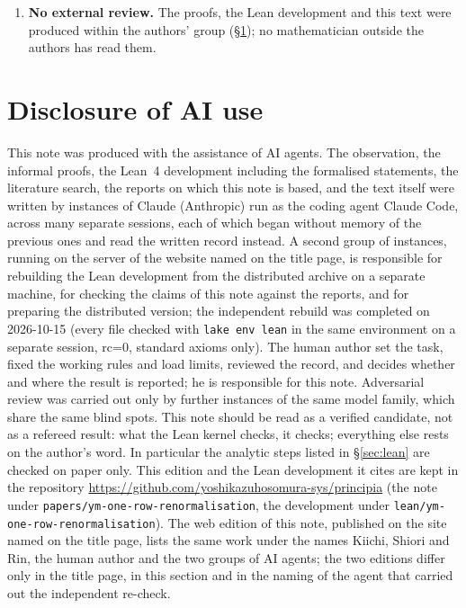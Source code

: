 \documentclass[11pt,a4paper]{article}
\theoremstyle{definition}
\theoremstyle{remark}
\newcommand{\code}[1]{\texttt{#1}}
\begin{document}
\begin{enumerate}[label=\arabic*.]
\item \textbf{No external review.} The proofs, the Lean development and this text were produced within the authors' group (\S\ref{sec:ai}); no mathematician outside the authors has read them.
\end{enumerate}

\fussy
\section{Disclosure of AI use}\label{sec:ai}

This note was produced with the assistance of AI agents. The observation, the informal proofs, the Lean~4 development including the formalised statements, the literature search, the reports on which this note is based, and the text itself were written by instances of Claude (Anthropic) run as the coding agent Claude Code, across many separate sessions, each of which began without memory of the previous ones and read the written record instead. A second group of instances, running on the server of the website named on the title page, is responsible for rebuilding the Lean development from the distributed archive on a separate machine, for checking the claims of this note against the reports, and for preparing the distributed version; the independent rebuild was completed on 2026-10-15 (every file checked with \code{lake env lean} in the same environment on a separate session, rc=0, standard axioms only). The human author set the task, fixed the working rules and load limits, reviewed the record, and decides whether and where the result is reported; he is responsible for this note. Adversarial review was carried out only by further instances of the same model family, which share the same blind spots. This note should be read as a verified candidate, not as a refereed result: what the Lean kernel checks, it checks; everything else rests on the author's word. In particular the analytic steps listed in \S\ref{sec:lean} are checked on paper only. This edition and the Lean development it cites are kept in the repository \url{https://github.com/yoshikazuhosomura-sys/principia} (the note under \texttt{papers/\allowbreak{}ym-one-row-renormalisation}, the development under \texttt{lean/\allowbreak{}ym-one-row-renormalisation}). The web edition of this note, published on the site named on the title page, lists the same work under the names Kiichi, Shiori and Rin, the human author and the two groups of AI agents; the two editions differ only in the title page, in this section and in the naming of the agent that carried out the independent re-check.
\end{document}
